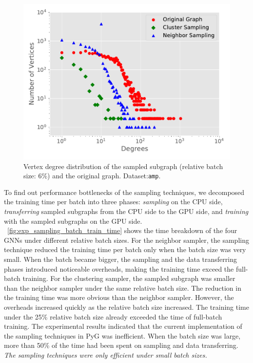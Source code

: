 \begin{figure}[H]
    \centering
    \includegraphics[width=0.4\columnwidth]{figs/experiments/exp_sampling_minibatch_degrees_distribution_amazon-photo.pdf}
    \caption{Vertex degree distribution of the sampled subgraph (relative batch size: 6\%) and the original graph. Dataset:\texttt{amp}.}
    \label{fig:exp_sampling_minibatch_degrees_distribution}
\end{figure}

To find out performance bottlenecks of the sampling techniques, we decomposed the training time per batch into three phases: \emph{sampling} on the CPU side, \emph{transferring} sampled subgraphs from the CPU side to the GPU side, and \emph{training} with the sampled subgraphs on the GPU side.
%
\figurename~\ref{fig:exp_sampling_batch_train_time} shows the time breakdown of the four GNNs under different relative batch sizes.
%
For the neighbor sampler, the sampling technique reduced the training time per batch only when the batch size was very small.
%
When the batch became bigger, the sampling and the data transferring phases introduced noticeable overheads, making the training time exceed the full-batch training.
%
For the clustering sampler, the sampled subgraph was smaller than the neighbor sampler under the same relative batch size.
%
The reduction in the training time was more obvious than the neighbor sampler.
%
However, the overheads increased quickly as the relative batch size increased.
%
The training time under the 25\% relative batch size already exceeded the time of full-batch training.
%
The experimental results indicated that the current implementation of the sampling techniques in PyG was inefficient.
%
When the batch size was large, more than 50\% of the time had been spent on sampling and data transferring.
%
\emph{The sampling techniques were only efficient under small batch sizes.}


